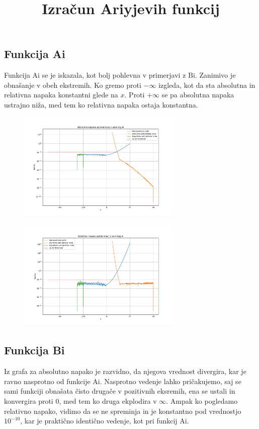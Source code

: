 \documentclass{article}
\newcommand{\Ai}{\mathrm{Ai}}
\newcommand{\Bi}{\mathrm{Bi}}
\theoremstyle{definition}
\theoremstyle{plain}
\numberwithin{definition}{section}
\numberwithin{theorem}{section} \title{Izračun Ariyjevih funkcij}
\begin{document}
\newpage

\subsection{Funkcija Ai}
Funkcija $\Ai$ se je iskazala, kot bolj pohlevna v primerjavi z $\Bi$. Zanimivo je obnašanje v obeh ekstremih.
Ko gremo proti $-\infty$ izgleda, kot da sta absolutna in relativna napaka konstantni glede na $x$. Proti
$+\infty$ se pa absolutna napaka ustrajno niža, med tem ko relativna napaka ostaja konstantna.

\begin{figure}[hb]
	\begin{center}
		\includegraphics[width=0.7\textwidth]{ai_abs.pdf}
	\end{center}
\end{figure}

\begin{figure}[ht]
	\begin{center}
		\includegraphics[width=0.7\textwidth]{ai_rel.pdf}
	\end{center}
\end{figure}

\newpage

\subsection{Funkcija Bi}
Iz grafa za absolutno napako je razvidno, da njegova vrednost divergira, kar je ravno nasprotno od funkcije $\Ai$.
Nasprotno vedenje lahko pričakujemo, saj se sami funkciji obnašata čisto drugače v pozitivnih eksremih, 
ena se ustali in konvergira proti $0$, med tem ko druga ekplodira v $\infty$. Ampak ko pogledamo relativno napako,
vidimo da se ne spreminja in je konstantno pod vrednostjo $10^{-10}$, kar je praktično identično vedenje, kot pri 
funkcij $\Ai$.
\end{document}
